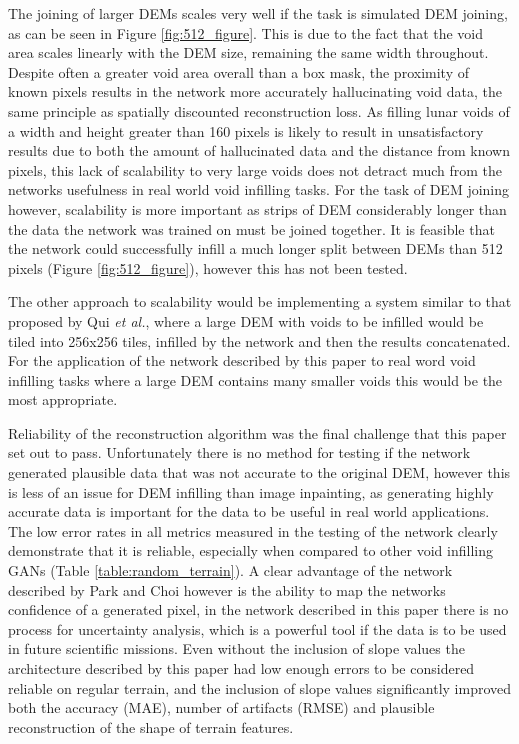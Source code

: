 \documentclass[twocolumn]{article}
\begin{document}
The joining of larger DEMs scales very well if the task is simulated DEM joining, as can be seen in Figure \ref{fig:512_figure}.
This is due to the fact that the void area scales linearly with the DEM size, remaining the same width throughout.
Despite often a greater void area overall than a box mask, the proximity of known pixels results in the network more accurately hallucinating void data, the same principle as spatially discounted reconstruction loss.
As filling lunar voids of a width and height greater than 160 pixels is likely to result in unsatisfactory results due to both the amount of hallucinated data and the distance from known pixels, this lack of scalability to very large voids does not detract much from the networks usefulness in real world void infilling tasks.
For the task of DEM joining however, scalability is more important as strips of DEM considerably longer than the data the network was trained on must be joined together.
It is feasible that the network could successfully infill a much longer split between DEMs than 512 pixels (Figure \ref{fig:512_figure}), however this has not been tested.

The other approach to scalability would be implementing a system similar to that proposed by Qui \emph{et al.}\autocite{qiuVoidFillingDigital2019}, where a large DEM with voids to be infilled would be tiled into 256x256 tiles, infilled by the network and then the results concatenated.
For the application of the network described by this paper to real word void infilling tasks where a large DEM contains many smaller voids this would be the most appropriate.

Reliability of the reconstruction algorithm was the final challenge that this paper set out to pass.
Unfortunately there is no method for testing if the network generated plausible data that was not accurate to the original DEM, however this is less of an issue for DEM infilling than image inpainting, as generating highly accurate data is important for the data to be useful in real world applications.
The low error rates in all metrics measured in the testing of the network clearly demonstrate that it is reliable, especially when compared to other void infilling GANs (Table \ref{table:random_terrain}).
A clear advantage of the network described by Park and Choi\autocite{parkNeuralProcessApproach2021} however is the ability to map the networks confidence of a generated pixel, in the network described in this paper there is no process for uncertainty analysis, which is a powerful tool if the data is to be used in future scientific missions.
Even without the inclusion of slope values the architecture described by this paper had low enough errors to be considered reliable on regular terrain, and the inclusion of slope values significantly improved both the accuracy (MAE), number of artifacts (RMSE) and plausible reconstruction of the shape of terrain features.
\end{document}
